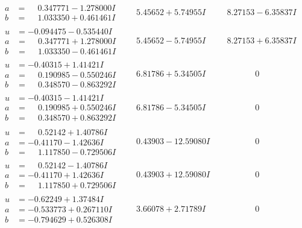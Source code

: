 \documentclass[1p]{elsarticle_modified}
\theoremstyle{definition}
\begin{document}
$$\begin{array}{c|c|c}
\begin{aligned}
a &= \phantom{-}0.347771 - 1.278000 I \\
b &= \phantom{-}1.033350 + 0.461461 I\end{aligned}
 & \phantom{-}5.45652 + 5.74955 I & \phantom{-}8.27153 - 6.35837 I \\ \hline\begin{aligned}
u &= -0.094475 - 0.535440 I \\
a &= \phantom{-}0.347771 + 1.278000 I \\
b &= \phantom{-}1.033350 - 0.461461 I\end{aligned}
 & \phantom{-}5.45652 - 5.74955 I & \phantom{-}8.27153 + 6.35837 I \\ \hline\begin{aligned}
u &= -0.40315 + 1.41421 I \\
a &= \phantom{-}0.190985 - 0.550246 I \\
b &= \phantom{-}0.348570 - 0.863292 I\end{aligned}
 & \phantom{-}6.81786 + 5.34505 I & \phantom{-0.000000 } 0 \\ \hline\begin{aligned}
u &= -0.40315 - 1.41421 I \\
a &= \phantom{-}0.190985 + 0.550246 I \\
b &= \phantom{-}0.348570 + 0.863292 I\end{aligned}
 & \phantom{-}6.81786 - 5.34505 I & \phantom{-0.000000 } 0 \\ \hline\begin{aligned}
u &= \phantom{-}0.52142 + 1.40786 I \\
a &= -0.41170 - 1.42636 I \\
b &= \phantom{-}1.117850 - 0.729506 I\end{aligned}
 & \phantom{-}0.43903 - 12.59080 I & \phantom{-0.000000 } 0 \\ \hline\begin{aligned}
u &= \phantom{-}0.52142 - 1.40786 I \\
a &= -0.41170 + 1.42636 I \\
b &= \phantom{-}1.117850 + 0.729506 I\end{aligned}
 & \phantom{-}0.43903 + 12.59080 I & \phantom{-0.000000 } 0 \\ \hline\begin{aligned}
u &= -0.62249 + 1.37484 I \\
a &= -0.533773 + 0.267110 I \\
b &= -0.794629 + 0.526308 I\end{aligned}
 & \phantom{-}3.66078 + 2.71789 I & \phantom{-0.000000 } 0 \\ \hline\begin{aligned}

\end{aligned}
\end{array}$$
\end{document}
